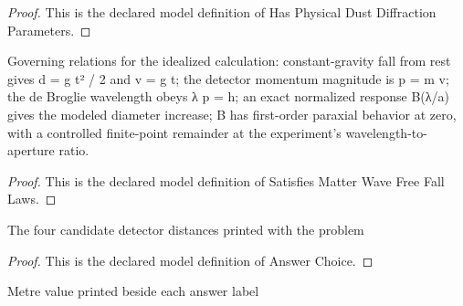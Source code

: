 \begin{proof}
  This is the declared model definition of Has Physical Dust Diffraction Parameters.
\end{proof}
\begin{definition}
  \label{def:physics:phyx-mini-0655:phyxminiproblems-problemphyxmini0655-satisfiesmatterwavefreefalllaws}
  Governing relations for the idealized calculation: constant-gravity fall from rest gives d = g t² / 2 and v = g t; the detector momentum magnitude is p = m v; the de Broglie wavelength obeys λ p = h; an exact normalized response B(λ/a) gives the modeled diameter increase; B has first-order paraxial behavior at zero, with a controlled finite-point remainder at the experiment's wavelength-to-aperture ratio.
\end{definition}
\begin{proof}
  This is the declared model definition of Satisfies Matter Wave Free Fall Laws.
\end{proof}
\begin{definition}
  \label{def:physics:phyx-mini-0655:phyxminiproblems-problemphyxmini0655-answerchoice}
  The four candidate detector distances printed with the problem
\end{definition}
\begin{proof}
  This is the declared model definition of Answer Choice.
\end{proof}
\begin{definition}
  \label{def:physics:phyx-mini-0655:phyxminiproblems-problemphyxmini0655-displayeddistanceinmeters}
  Metre value printed beside each answer label
\end{definition}
